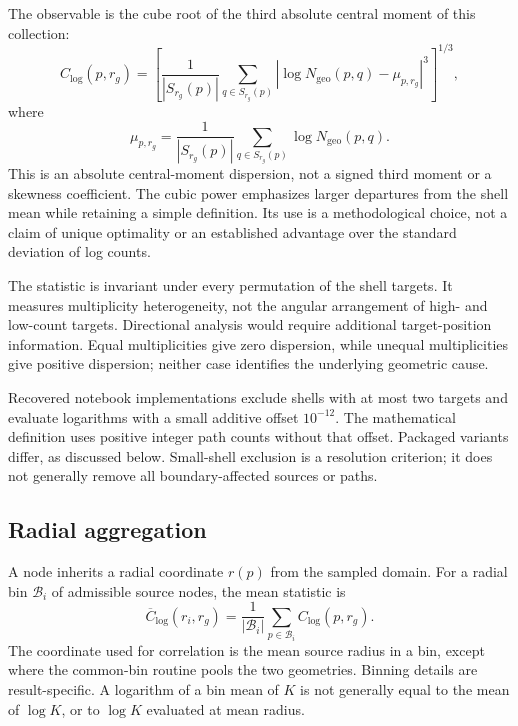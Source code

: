 \documentclass[11pt,a4paper]{article}
\begin{document}
The observable is the cube root of the third absolute central moment of this collection:
\begin{equation}
C_{\log}(p,r_g)=
\left[\frac{1}{|S_{r_g}(p)|}\sum_{q\in S_{r_g}(p)}
\left|\log N_{\mathrm{geo}}(p,q)-\mu_{p,r_g}\right|^3
\right]^{1/3},
\label{eq:clog}
\end{equation}
where
\begin{equation}
\mu_{p,r_g}=\frac{1}{|S_{r_g}(p)|}\sum_{q\in S_{r_g}(p)}\log N_{\mathrm{geo}}(p,q).
\end{equation}
This is an absolute central-moment dispersion, not a signed third moment or a skewness coefficient. The cubic power emphasizes larger departures from the shell mean while retaining a simple definition. Its use is a methodological choice, not a claim of unique optimality or an established advantage over the standard deviation of log counts.

The statistic is invariant under every permutation of the shell targets. It measures multiplicity heterogeneity, not the angular arrangement of high- and low-count targets. Directional analysis would require additional target-position information. Equal multiplicities give zero dispersion, while unequal multiplicities give positive dispersion; neither case identifies the underlying geometric cause.

Recovered notebook implementations exclude shells with at most two targets and evaluate logarithms with a small additive offset $10^{-12}$. The mathematical definition uses positive integer path counts without that offset. Packaged variants differ, as discussed below. Small-shell exclusion is a resolution criterion; it does not generally remove all boundary-affected sources or paths.

\subsection{Radial aggregation}
A node inherits a radial coordinate $r(p)$ from the sampled domain. For a radial bin $\mathcal{B}_i$ of admissible source nodes, the mean statistic is
\begin{equation}
\overline{C}_{\log}(r_i,r_g)=\frac{1}{|\mathcal{B}_i|}\sum_{p\in\mathcal{B}_i}C_{\log}(p,r_g).
\end{equation}
The coordinate used for correlation is the mean source radius in a bin, except where the common-bin routine pools the two geometries. Binning details are result-specific. A logarithm of a bin mean of $K$ is not generally equal to the mean of $\log K$, or to $\log K$ evaluated at mean radius.
\end{document}
